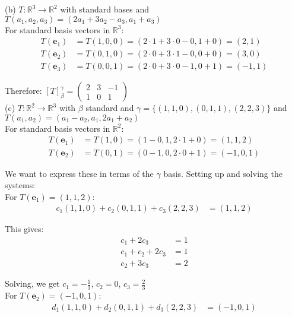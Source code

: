 \documentclass{article}
\begin{document}
(b) $T : \mathbb{R}^3 \to \mathbb{R}^2$ with standard bases and $T(a_1, a_2, a_3) = (2a_1 + 3a_2 - a_3, a_1 + a_3)$ \\

For standard basis vectors in $\mathbb{R}^3$:
\begin{align*}
T(\mathbf{e}_1) &= T(1,0,0) = (2 \cdot 1 + 3 \cdot 0 - 0, 1 + 0) = (2, 1)\\
T(\mathbf{e}_2) &= T(0,1,0) = (2 \cdot 0 + 3 \cdot 1 - 0, 0 + 0) = (3, 0)\\
T(\mathbf{e}_3) &= T(0,0,1) = (2 \cdot 0 + 3 \cdot 0 - 1, 0 + 1) = (-1, 1)
\end{align*}

Therefore:
$[T]_\beta^\gamma = \begin{pmatrix} 
2 & 3 & -1 \\ 
1 & 0 & 1 
\end{pmatrix}$ \\

(c) $T : \mathbb{R}^2 \to \mathbb{R}^3$ with $\beta$ standard and $\gamma = \{(1,1,0),(0,1,1),(2,2,3)\}$ and $T(a_1, a_2) = (a_1 - a_2, a_1, 2a_1 + a_2)$ \\

For standard basis vectors in $\mathbb{R}^2$:
\begin{align*}
T(\mathbf{e}_1) &= T(1,0) = (1 - 0, 1, 2 \cdot 1 + 0) = (1, 1, 2)\\
T(\mathbf{e}_2) &= T(0,1) = (0 - 1, 0, 2 \cdot 0 + 1) = (-1, 0, 1)
\end{align*}

We want to express these in terms of the $\gamma$ basis. Setting up and solving the systems: \\

For $T(\mathbf{e}_1) = (1, 1, 2)$:
\begin{align*}
c_1(1,1,0) + c_2(0,1,1) + c_3(2,2,3) &= (1,1,2)
\end{align*}

This gives:
\begin{align*}
c_1 + 2c_3 &= 1\\
c_1 + c_2 + 2c_3 &= 1\\
c_2 + 3c_3 &= 2
\end{align*}

Solving, we get $c_1 = -\frac{1}{3}$, $c_2 = 0$, $c_3 = \frac{2}{3}$ \\

For $T(\mathbf{e}_2) = (-1, 0, 1)$:
\begin{align*}
d_1(1,1,0) + d_2(0,1,1) + d_3(2,2,3) &= (-1,0,1)
\end{align*}
\end{document}
